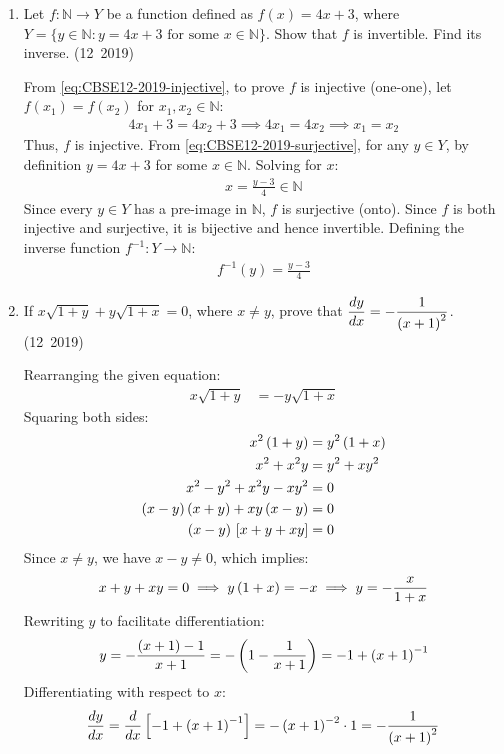 \begin{enumerate}[label=\thesubsection.\arabic*, ref=\thesubsection.\theenumi]
\item Let $f:\mathbb{N}\to Y$ be a function defined as $f(x)=4x+3$, where $Y=\{y\in\mathbb{N}:y=4x+3\text{ for some }x\in\mathbb{N}\}$. Show that $f$ is invertible. Find its inverse.
\hfill (12~2019)

\solution
From \eqref{eq:CBSE12-2019-injective}, to prove $f$ is injective (one-one), let $f(x_1) = f(x_2)$ for $x_1, x_2 \in \mathbb{N}$:
\begin{align}
	4x_1 + 3 = 4x_2 + 3 \implies 4x_1 = 4x_2 \implies x_1 = x_2
\end{align}
Thus, $f$ is injective.
From \eqref{eq:CBSE12-2019-surjective}, for any $y \in Y$, by definition $y = 4x + 3$ for some $x \in \mathbb{N}$. Solving for $x$:
\begin{align}
	x = \frac{y - 3}{4} \in \mathbb{N}
\end{align}
Since every $y \in Y$ has a pre-image in $\mathbb{N}$, $f$ is surjective (onto).
Since $f$ is both injective and surjective, it is bijective and hence invertible.
Defining the inverse function $f^{-1}: Y \to \mathbb{N}$:
\begin{align}
	f^{-1}(y) = \frac{y - 3}{4}
\end{align}

\item If $x\sqrt{1+y}+y\sqrt{1+x}=0$, where $x \neq y$, prove that $\dfrac{dy}{dx} = -\dfrac{1}{\left(x+1\right)^2}$.
\hfill (12~2019)

\solution
Rearranging the given equation:
\begin{align}
	x\sqrt{1+y} &= -y\sqrt{1+x}
\end{align}
Squaring both sides:
\begin{align}
	x^2\left(1+y\right) &= y^2\left(1+x\right) \\
	x^2 + x^2y &= y^2 + xy^2 \\
	x^2 - y^2 + x^2y - xy^2 &= 0 \\
	\left(x - y\right)\left(x + y\right) + xy\left(x - y\right) &= 0 \\
	\left(x - y\right){}\left[x + y + xy\right] &= 0
\end{align}
Since $x \neq y$, we have $x - y \neq 0$, which implies:
\begin{align}
	x + y + xy = 0 \implies y\left(1 + x\right) = -x \implies y = -\frac{x}{1 + x}
\end{align}
Rewriting $y$ to facilitate differentiation:
\begin{align}
	y = -\frac{\left(x + 1\right) - 1}{x + 1} = -\left(1 - \frac{1}{x+1}\right) = -1 + \left(x+1\right)^{-1}
\end{align}
Differentiating with respect to $x$:
\begin{align}
	\frac{dy}{dx} = \frac{d}{dx}{}\left[-1 + \left(x+1\right)^{-1}\right] = -\left(x+1\right)^{-2}\cdot 1 = -\frac{1}{\left(x+1\right)^2}
\end{align}



\end{enumerate}

